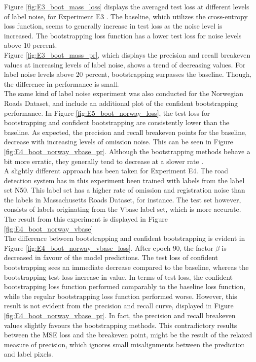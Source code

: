 Figure \ref{fig:E3_boot_mass_loss} displays the averaged test loss at different levels of label noise, for Experiment E3 . The baseline, which utilizes the cross-entropy loss function, seems to generally increase in test loss as the noise level is increased. The bootstrapping loss function has a lower test loss for noise levels above 10 percent.\\

Figure \ref{fig:E3_boot_mass_pr}, which displays the precision and recall breakeven values at increasing levels of label noise, shows a trend of decreasing values.  For label noise levels above 20 percent, bootstrapping surpasses the baseline. Though, the difference in performance is small.\\

The same kind of label noise experiment was also conducted for the Norwegian Roads Dataset, and include an additional plot of the confident bootstrapping performance. In Figure \ref{fig:E5_boot_norway_loss}, the test loss for bootstrapping and confident bootstrapping are consistently lower than the baseline. As expected, the precision and recall breakeven points for the baseline, decrease with increasing levels of omission noise. This can be seen in Figure \ref{fig:E4_boot_norway_vbase_pr}. Although the bootstrapping methods behave a bit more erratic, they generally tend to decrease at a slower rate .\\

A slightly different approach has been taken for Experiment E4. The road detection system has in this experiment been trained with labels from the label set N50. This label set has a higher rate of omission and registration noise than the labels in Massachusetts Roads Dataset, for instance. The test set however, consists of labels originating from the Vbase label set, which is more accurate. The result from this experiment is displayed in Figure \ref{fig:E4_boot_norway_vbase}\\

The difference between bootstrapping and confident bootstrapping is evident in Figure \ref{fig:E4_boot_norway_vbase_loss}. After epoch 90, the factor $\beta$ is decreased in favour of the model predictions. The test loss of confident bootstrapping sees an immediate decrease compared to the baseline, whereas the bootstrapping test loss increase in value. In terms of test loss, the confident bootstrapping loss function performed comparably to the baseline loss function, while the regular bootstrapping loss function performed worse. However, this result is not evident from the precision and recall curve, displayed in Figure \ref{fig:E4_boot_norway_vbase_pr}. In fact, the precision and recall breakeven values slightly favours the bootstrapping methods. This contradictory results between the MSE loss and the breakeven point, might be the result of the relaxed measure of precision, which ignores small misalignments between the prediction and label pixels.\\

